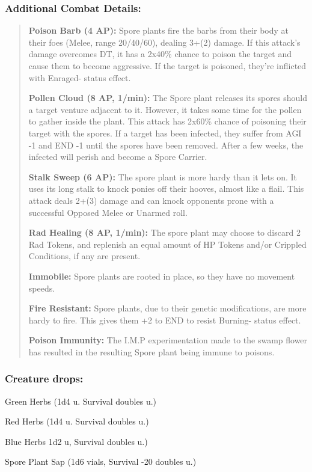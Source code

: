 \documentclass[11pt,a4paper,twocolumn]{book}
\begin{document}
	\subsubsection*{Additional Combat Details:}
	\begin{verse}
		\textbf{Poison Barb (4 AP):} Spore plants fire the barbs from their body at their foes (Melee, range 20/40/60), dealing 3+(2) damage. If this attack's damage overcomes DT, it has a 2x40\% chance to poison the target and cause them to become aggressive. If the target is poisoned, they're inflicted with Enraged- status effect.
		
		\textbf{Pollen Cloud (8 AP, 1/min):} The Spore plant releases its spores should a target venture adjacent to it. However, it takes some time for the pollen to gather inside the plant. This attack has 2x60\% chance of poisoning their target with the spores. If a target has been infected, they suffer from AGI -1 and END -1 until the spores have been removed. After a few weeks, the infected will perish and become a Spore Carrier.
		
		\textbf{Stalk Sweep (6 AP):} The spore plant is more hardy than it lets on. It uses its long stalk to knock ponies off their hooves, almost like a flail. This attack deals 2+(3) damage and can knock opponents prone with a successful Opposed Melee or Unarmed roll.
		
		\textbf{Rad Healing (8 AP, 1/min):} The spore plant may choose to discard 2 Rad Tokens, and replenish an equal amount of HP Tokens and/or Crippled Conditions, if any are present.
		
		\textbf{Immobile:} Spore plants are rooted in place, so they have no movement speeds.
		
		\textbf{Fire Resistant:} Spore plants, due to their genetic modifications, are more hardy to fire. This gives them +2 to END to resist Burning- status effect.
		
		\textbf{Poison Immunity:} The I.M.P experimentation made to the swamp flower has resulted in the resulting Spore plant being immune to poisons.
	\end{verse}
	
	\subsubsection*{Creature drops:}
	\begin{compactitem}
		\item Green Herbs (1d4 u. Survival doubles u.)
		\item Red Herbs (1d4 u. Survival doubles u.)
		\item Blue Herbs  1d2 u, Survival doubles u.)
		\item Spore Plant Sap (1d6 vials, Survival -20 doubles u.)
	\end{compactitem}
	
\end{document}
